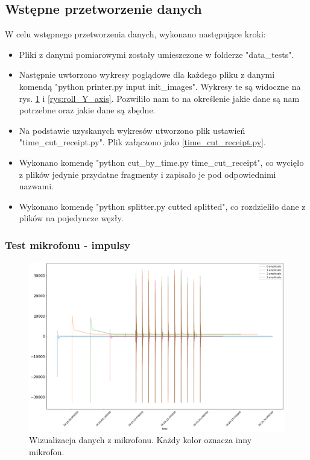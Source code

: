 \documentclass[12pt,oneside,a4paper]{book}
\theoremstyle{break}
\begin{document}
\subsection{Wstępne przetworzenie danych}
W celu wstępnego przetworzenia danych, wykonano następujące kroki:

\begin{itemize}
    \item Pliki z danymi pomiarowymi zostały umieszczone w folderze "data\_tests".
    \item Następnie uwtorzono wykresy poglądowe dla każdego pliku 
    z danymi komendą "python printer.py input init\_images". Wykresy
    te są widoczne na rys. \ref{rys:mic_test} i \ref{rys:roll_Y_axis}. 
    Pozwiliło nam to na określenie jakie dane są nam potrzebne oraz 
    jakie dane są zbędne.
    \item Na podstawie uzyskanych wykresów utworzono plik ustawień "time\_cut\_receipt.py".
    Plik załączono jako \ref*{time_cut_receipt.py}.
    \item Wykonano komendę "python cut\_by\_time.py 
    time\_cut\_receipt", co wycięło z plików jedynie przydatne 
    fragmenty i zapisało je pod odpowiednimi nazwami.
    \item Wykonano komendę "python splitter.py cutted splitted",
    co rozdzieliło dane z plików na pojedyncze węzły.
\end{itemize}

\subsubsection{Test mikrofonu - impulsy}

\begin{figure}[H]
    \begin{center}
        \includegraphics[width=\textwidth]{mic_test.png}
        \caption{Wizualizacja danych z mikrofonu. Każdy kolor oznacza inny mikrofon.}
        \label{rys:mic_test}
    \end{center}
\end{figure}
\end{document}
